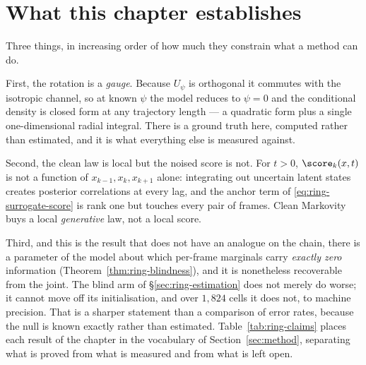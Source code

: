\section{What this chapter establishes}\label{sec:ring-answers}

Three things, in increasing order of how much they constrain what a method can
do.

First, the rotation is a \emph{gauge}. Because $U_\psi$ is orthogonal it
commutes with the isotropic channel, so at known $\psi$ the model reduces to
$\psi = 0$ and the conditional density is closed form at any trajectory length
--- a quadratic form plus a single one-dimensional radial integral. There is a
ground truth here, computed rather than estimated, and it is what everything
else is measured against.

Second, the clean law is local but the noised score is not. For $t>0$,
$\score_k(x,t)$ is not a function of $x_{k-1},x_k,x_{k+1}$ alone: integrating
out uncertain latent states creates posterior correlations at every lag, and
the anchor term of \eqref{eq:ring-surrogate-score} is rank one but touches
every pair of frames. Clean Markovity buys a local \emph{generative} law, not a
local score.

Third, and this is the result that does not have an analogue on the chain,
there is a parameter of the model about which per-frame marginals carry
\emph{exactly zero} information (Theorem~\ref{thm:ring-blindness}), and it is
nonetheless recoverable from the joint. The blind arm of
\S\ref{sec:ring-estimation} does not merely do worse; it cannot move off its
initialisation, and over $1{,}824$ cells it does not, to machine precision.
That is a sharper statement than a comparison of error rates, because the null
is known exactly rather than estimated.
Table~\ref{tab:ring-claims} places each result of the chapter in the vocabulary
of Section~\ref{sec:method}, separating what is proved from what is measured and
from what is left open.

